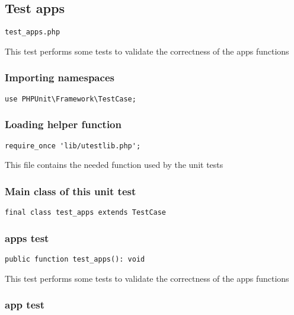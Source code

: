 \documentclass[a4paper]{article}
\begin{document}
\hypertarget{toc31}{}
\subsection{Test apps}

\begin{lstlisting}
test_apps.php
\end{lstlisting}

This test performs some tests to validate the correctness
of the apps functions

\hypertarget{toc32}{}
\subsubsection{Importing namespaces}

\begin{lstlisting}
use PHPUnit\Framework\TestCase;
\end{lstlisting}

\hypertarget{toc33}{}
\subsubsection{Loading helper function}

\begin{lstlisting}
require_once 'lib/utestlib.php';
\end{lstlisting}

This file contains the needed function used by the unit tests

\hypertarget{toc34}{}
\subsubsection{Main class of this unit test}

\begin{lstlisting}
final class test_apps extends TestCase
\end{lstlisting}

\hypertarget{toc35}{}
\subsubsection{apps test}

\begin{lstlisting}
public function test_apps(): void
\end{lstlisting}

This test performs some tests to validate the correctness
of the apps functions

\hypertarget{toc36}{}
\subsubsection{app test}
\end{document}
